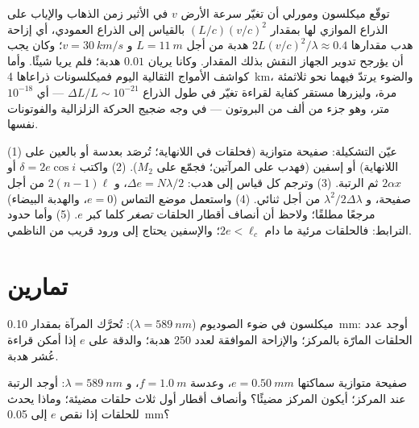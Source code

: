 \begin{remark}\label{rem:b2:michelson:history}
توقّع ميكلسون ومورلي أن تغيّر سرعة الأرض $v$ في
الأثير زمن الذهاب والإياب على الذراع الموازي لها بمقدار
$(L/c)(v/c)^2$ بالقياس إلى الذراع العمودي، أي إزاحة هدب مقدارها
$2L(v/c)^2/\lambda \approx 0.4$ هدبة من أجل $L = \qty{11}{m}$ و $v = \qty{30}{km/s}$؛
وكان يجب أن يؤرجح تدوير الجهاز النقش بذلك المقدار.
وكانا يريان $0.01$ هدبة؛ فلم يريا شيئًا. وأما كواشف الأمواج
الثقالية اليوم فميكلسونات ذراعاها \qty{4}{km}، والضوء يرتدّ
فيهما نحو ثلاثمئة مرة، وليزرها مستقر كفاية لقراءة
تغيّر في طول الذراع $\Delta L/L \sim 10^{-21}$ --- أي $10^{-18}$ متر، وهو جزء من ألف
من البروتون --- في وجه ضجيج الحركة الزلزالية والفوتونات
نفسها.
\end{remark}

\begin{method}\label{met:b2:michelson:method}
(1) عيّن التشكيلة: صفيحة متوازية (فحلقات في اللانهاية؛
تُرصَد بعدسة أو بالعين على اللانهاية) أو إسفين (فهدب على
المرآتين؛ فجمّع على $M_2$). (2) واكتب $\delta = 2e\cos i$ أو $2\alpha x$ ثم
الرتبة. (3) وترجم كل قياس إلى هدب: $\Delta e = N\lambda/2$،
و $2(n - 1)\ell$ من أجل صفيحة، و $\lambda^2/2\Delta\lambda$ من أجل ثنائي. (4) واستعمل
موضع التماس ($e = 0$، والهدبة البيضاء) مرجعًا مطلقًا؛
ولاحظ أن أنصاف أقطار الحلقات \emph{تصغر} كلما كبر $e$. (5) وأما حدود
الترابط: فالحلقات مرئية ما دام $2e < \ell_c$؛ والإسفين يحتاج إلى
ورود قريب من الناظمي.
\end{method}

\section{تمارين}

\begin{exercise}[$\star$]\label{exo:b2:michelson:1}
ميكلسون في ضوء الصوديوم ($\lambda = \qty{589}{nm}$): تُحرَّك المرآة بمقدار
\qty{0.10}{mm}: أوجد عدد الحلقات المارّة بالمركز؛ والإزاحة
الموافقة لعدد $250$ هدبة؛ والدقة على $e$ إذا أمكن قراءة عُشر
هدبة.
\end{exercise}

\begin{exercise}[$\star$]\label{exo:b2:michelson:2}
صفيحة متوازية سماكتها $e = \qty{0.50}{mm}$، وعدسة $f = \qty{1.0}{m}$، و $\lambda =
\qty{589}{nm}$: أوجد الرتبة عند المركز؛ أيكون المركز مضيئًا؟ وأنصاف أقطار
أول ثلاث حلقات مضيئة؛ وماذا يحدث للحلقات إذا نقص $e$
إلى \qty{0.05}{mm}؟
\end{exercise}

